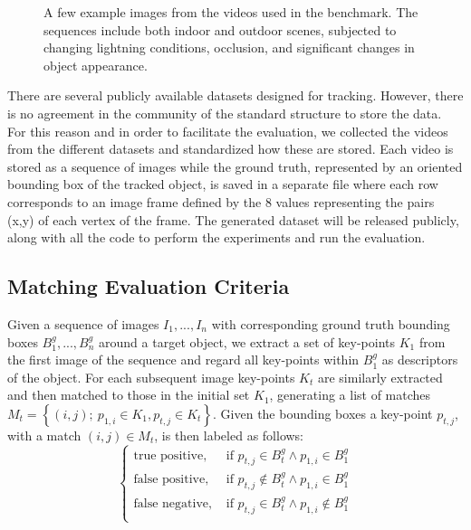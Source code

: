 \begin{figure}[t]
{	
	}
\caption{A few example images from the videos used in the benchmark. The sequences include both indoor and outdoor scenes, subjected to changing lightning conditions, 
occlusion, and significant changes in object appearance.}
\vspace{-3mm}
\label{fig:tracking_results}
\end{figure}


There are several publicly available datasets designed for tracking. However, there is no agreement in the community of the standard structure to store the data. For this reason and in order to facilitate the evaluation, we collected the videos from the different datasets and standardized how these are stored. Each video is stored as a sequence of images while the ground truth, represented by an oriented bounding box of the tracked object, is saved in a separate file where each row corresponds to an image frame defined by the 8 values representing the pairs (x,y) of each vertex of the frame. The generated dataset will be released publicly, along with all the code to perform the experiments and run the evaluation.

\subsection{Matching Evaluation Criteria}
Given a sequence of images $I_{1},...,I_{n}$ with corresponding ground truth bounding boxes $B^g_{1},...,B^g_{n}$ around a target object, we extract a set of key-points $K_1$ from the first image of the sequence and regard all key-points within $B^g_{1}$ as descriptors of the object. For each subsequent image key-points $K_{t}$ are similarly extracted and then matched to those in the initial set $K_{1}$, generating a list of matches $M_t = \left\lbrace (i,j); ~p_{1,i} \in K_1, p_{t,j} \in K_t \right\rbrace$. Given the bounding boxes a key-point $p_{t,j}$, with a match $(i,j)\in M_t$, is then labeled as follows:
\begin{equation}
\begin{cases}
\text{true positive},&  \text{ if } p_{t,j} \in B^g_{t} \land p_{1,i} \in B^g_{1} \\
\text{false positive},&  \text{ if } p_{t,j} \notin B^g_{t} \land p_{1,i} \in B^g_{1} \\
\text{false negative},&  \text{ if } p_{t,j} \in B^g_{t} \land p_{1,i} \notin B^g_{1} \\
\end{cases}
\end{equation}

